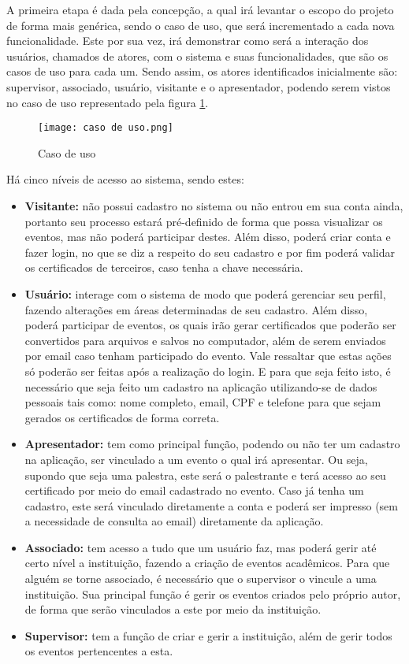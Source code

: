 A primeira etapa é dada pela concepção, a qual irá levantar o escopo do projeto de forma mais genérica, sendo o caso de uso, que será incrementado a cada nova funcionalidade. Este por sua vez, irá demonstrar como será a interação dos usuários, chamados de atores, com o sistema e suas funcionalidades, que são os casos de uso para cada um. Sendo assim, os atores identificados inicialmente são: supervisor, associado, usuário, visitante e o apresentador, podendo serem vistos no caso de uso representado pela figura \ref{fig_caso_uso}.

\begin{figure}[H]
    \caption{\label{fig_caso_uso}Caso de uso}
    \vspace{5pt}
    \centering
    \texttt{[image: caso de uso.png]}
    \vspace{5pt}
\end{figure}

Há cinco níveis de acesso ao sistema, sendo estes:
\begin{itemize}
    \item \textbf{Visitante: } não possui cadastro no sistema ou não entrou em sua conta ainda, portanto seu processo estará pré-definido de forma que possa visualizar os eventos, mas não poderá participar destes. Além disso, poderá criar conta e fazer login, no que se diz a respeito do seu cadastro e por fim poderá validar os certificados de terceiros, caso tenha a chave necessária.
    \item \textbf{Usuário: }interage com o sistema de modo que poderá gerenciar seu perfil, fazendo alterações em áreas determinadas de seu cadastro. Além disso, poderá participar de eventos, os quais irão gerar certificados que poderão ser convertidos para arquivos e salvos no computador, além de serem enviados por email caso tenham participado do evento. Vale ressaltar que estas ações só poderão ser feitas após a realização do login. E para que seja feito isto, é necessário que seja feito um cadastro na aplicação utilizando-se de dados pessoais tais como: nome completo, email, CPF e telefone para que sejam gerados os certificados de forma correta. 
    \item \textbf{Apresentador: }tem como principal função, podendo ou não ter um cadastro na aplicação, ser vinculado a um evento o qual irá apresentar. Ou seja, supondo que seja uma palestra, este será o palestrante e terá acesso ao seu certificado por meio do email cadastrado no evento. Caso já tenha um cadastro, este será vinculado diretamente a conta e poderá ser impresso (sem a necessidade de consulta ao email) diretamente da aplicação.
    \item \textbf{Associado: }tem acesso a tudo que um usuário faz, mas poderá gerir até certo nível a instituição, fazendo a criação de eventos acadêmicos. Para que alguém se torne associado, é necessário que o supervisor o vincule a uma instituição. Sua principal função é gerir os eventos criados pelo próprio autor, de forma que serão vinculados a este por meio da instituição.
    \item \textbf{Supervisor: }tem a função de criar e gerir a instituição, além de gerir todos os eventos pertencentes a esta.
\end{itemize}


